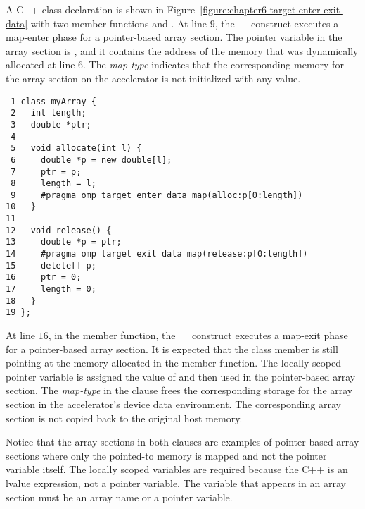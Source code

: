 A C++ class declaration is shown in
Figure~\ref{figure:chapter6-target-enter-exit-data} with two member functions
 and .  At line $9$, the
~~ construct executes a map-enter phase for
a pointer-based array section. The pointer variable in the array section is
, and it contains the address of the memory that was dynamically allocated
at line $6$.  The  \emph{map-type} indicates that the corresponding
memory for the array section on the accelerator is not initialized with any
value.

\begin{figure*}[!tb]
\begin{verbatim}
 1 class myArray {
 2   int length;
 3   double *ptr;
 4 
 5   void allocate(int l) {
 6     double *p = new double[l];
 7     ptr = p;
 8     length = l;
 9     #pragma omp target enter data map(alloc:p[0:length])
10   }
11 
12   void release() {
13     double *p = ptr;
14     #pragma omp target exit data map(release:p[0:length])
15     delete[] p;
16     ptr = 0;
17     length = 0;
18   }
19 };
\end{verbatim}
\caption{ \textbf {C++ Example of the target enter and exit data constructs} -- \small
          The \texttt{allocate()} method will execute a map-enter phase for the
          dynamically allocated memory pointed to by \texttt{p}.  The \texttt{release()}
          method will execute the corresponding map-exit phase.
         }
\label{figure:chapter6-target-enter-exit-data}
\end{figure*}

At line $16$, in the  member function, the
~~ construct executes a map-exit phase for a
pointer-based array section.  It is expected that the class member  is
still pointing at the memory allocated in the  member function.  The
locally scoped pointer variable  is assigned the value of  and then
used in the pointer-based array section.  The  \emph{map-type} in the
 clause frees the corresponding storage for the array section in the
accelerator's device data environment.  The corresponding array section is not
copied back to the original host memory.

Notice that the array sections in both  clauses are examples of
pointer-based array sections where only the pointed-to memory is mapped and not
the pointer variable itself.  The locally scoped  variables are required
because the C++  is an lvalue expression, not a pointer variable.
The variable that appears in an array section must be an array name or a
pointer variable.

